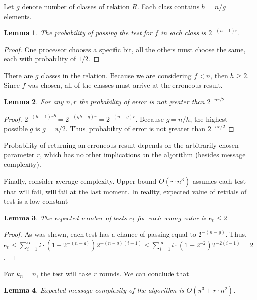 \documentclass{article}
\newtheorem{lemma}{Lemma}
\begin{document}
Let $g$ denote number of classes of relation $R$. Each class contains $h = n/g$ elements.
\begin{lemma}
The probability of passing the test for $f$ in each class is $2^{-(h-1)r}$.
\end{lemma}
\begin{proof}
One processor chooses a specific bit, all the others must choose the same, each with probability of $1/2$.
\end{proof}
There are $g$ classes in the relation. Because we are considering $f < n$, then $h \geq 2$. Since $f$ was chosen, all of the classes must arrive at the erroneous result.

\begin{lemma}
For any $n, r$ the probability of error is not greater than $2^{-n r/2}$
\end{lemma}
\begin{proof}
${2^{-(h-1)r}}^g = 2^{-(gh-g)r} = 2^{-(n-g)r}$. Because $g = n/h$, the highest possible $g$ is $g = n/2$. Thus, probability of error is not greater than $2^{-nr/2}$
\end{proof}

Probability of returning an erroneous result depends on the arbitrarily chosen parameter $r$, which has no other implications on the algorithm (besides message complexity).

Finally, consider average complexity. Upper bound $O(r \cdot n^3)$ assumes each test that will fail, will fail at the last moment. In reality, expected value of retrials of test is a low constant

\begin{lemma}
The expected number of tests $e_t$ for each wrong value is $e_t \leq 2$.
\end{lemma}
\begin{proof}
As was shown, each test has a chance of passing equal to $2^{-(n-g)} $. Thus, $e_t \leq \sum_{i=1}^{\infty}i \cdot {(1-2^{-(n-g)})}2^{-(n-g)(i-1)} \leq 
\sum_{i=1}^{\infty}i \cdot {(1-2^{-2})}2^{-2(i-1)} = 2$.
\end{proof}

For $k_n = n$, the test will take $r$ rounds. We can conclude that
\begin{lemma}
Expected message complexity of the algorithm is $O(n^3 + r \cdot n^2)$.
\end{lemma}

\printbibliography
\end{document}
